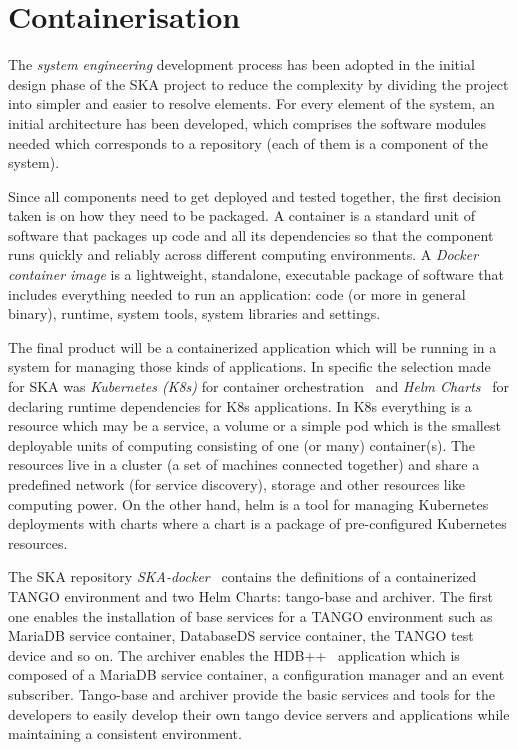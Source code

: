 \documentclass[a4paper]{spie}  %
\begin{document}
\section{Containerisation} \label{SKA-docker}
The \textit{system engineering} development process has been adopted in the initial design phase of the SKA project to reduce the complexity by dividing the project into simpler and easier to resolve elements. For every element of the system, an initial architecture has been developed, which comprises the software modules needed which corresponds to a repository (each of them is a component of the system).

Since all components need to get deployed and tested together, the first decision taken is on how they need to be packaged.  A container is a standard unit of software that packages up code and all its dependencies so that the component runs quickly and reliably across different computing environments. A \textit{Docker container image} is a lightweight, standalone, executable package of software that includes everything needed to run an application: code (or more in general binary), runtime, system tools, system libraries and settings.

The final product will be a containerized application which will be running in a system for managing those kinds of applications. In specific the selection made for SKA was \textit{Kubernetes (K8s)} for container orchestration~\cite{kubernetes} and \textit{Helm Charts}~\cite{helm} for declaring runtime dependencies for K8s applications. In K8s everything is a resource which may be a service, a volume or a simple pod which is the smallest deployable units of computing consisting of one (or many) container(s). The resources live in a cluster (a set of machines connected together) and share a predefined network (for service discovery), storage and other resources like computing power. On the other hand, helm is a tool for managing Kubernetes deployments with charts where a chart is a package of pre-configured Kubernetes resources.

The SKA repository \textit{SKA-docker}~\cite{SKA-docker} contains the definitions of a containerized TANGO environment and two Helm Charts: tango-base and archiver. The first one enables the installation of base services for a TANGO environment such as MariaDB service container, DatabaseDS service container, the TANGO test device and so on. The archiver enables the HDB++~\cite{hdb} application which is composed of a MariaDB service container, a configuration manager and an event subscriber. Tango-base and archiver provide the basic services and tools for the developers to easily develop their own tango device servers and applications while maintaining a consistent environment.
\end{document}
